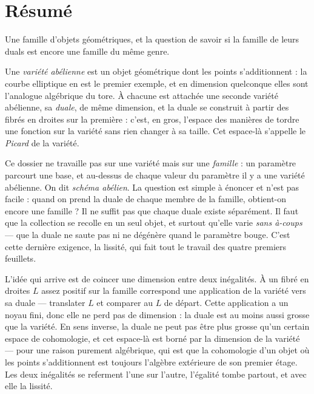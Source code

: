 \documentclass[11pt,a4paper]{article}
\begin{document}
\section*{Résumé}

\begin{resume}
Une famille d'objets géométriques, et la question de savoir si la famille de
leurs duals est encore une famille du même genre.

Une \emph{variété abélienne} est un objet géométrique dont les points
s'additionnent : la courbe elliptique en est le premier exemple, et en
dimension quelconque elles sont l'analogue algébrique du tore. À chacune est
attachée une seconde variété abélienne, sa \emph{duale}, de même dimension, et
la duale se construit à partir des fibrés en droites sur la première : c'est,
en gros, l'espace des manières de tordre une fonction sur la variété sans
rien changer à sa taille. Cet espace-là s'appelle le \emph{Picard} de la
variété.

Ce dossier ne travaille pas sur une variété mais sur une \emph{famille} : un
paramètre parcourt une base, et au-dessus de chaque valeur du paramètre il y a
une variété abélienne. On dit \emph{schéma abélien}. La question est simple à
énoncer et n'est pas facile : quand on prend la duale de chaque membre de la
famille, obtient-on encore une famille ? Il ne suffit pas que chaque duale
existe séparément. Il faut que la collection se recolle en un seul objet, et
surtout qu'elle varie \emph{sans à-coups} — que la duale ne saute pas ni ne
dégénère quand le paramètre bouge. C'est cette dernière exigence, la
lissité, qui fait tout le travail des quatre premiers feuillets.

L'idée qui arrive est de coincer une dimension entre deux inégalités. À un
fibré en droites $L$ assez positif sur la famille correspond une application de
la variété vers sa duale — translater $L$ et comparer au $L$ de départ. Cette
application a un noyau fini, donc elle ne perd pas de dimension : la duale est
au moins aussi grosse que la variété. En sens inverse, la duale ne peut pas
être plus grosse qu'un certain espace de cohomologie, et cet espace-là est
borné par la dimension de la variété — pour une raison purement algébrique, qui
est que la cohomologie d'un objet où les points s'additionnent est toujours
l'algèbre extérieure de son premier étage. Les deux inégalités se referment
l'une sur l'autre, l'égalité tombe partout, et avec elle la lissité.


\end{resume}
\end{document}
